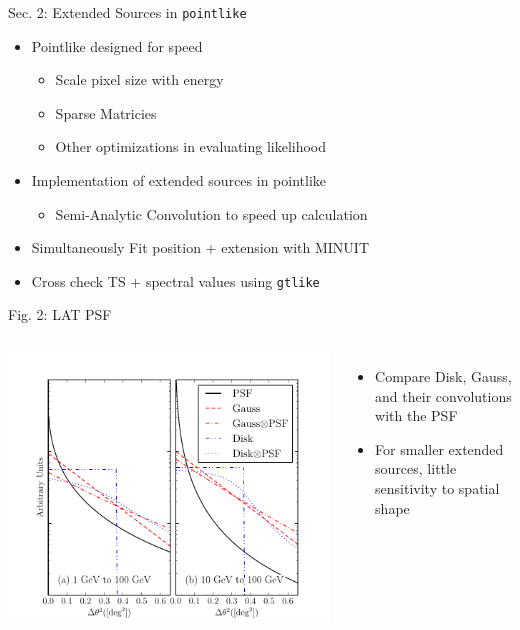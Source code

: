 \documentclass[12pt]{beamer}
\begin{document}
\begin{frame}{Sec. 2: Extended Sources in \texttt{pointlike}}
  \begin{itemize}
    \item Pointlike designed for speed
    \begin{itemize}
    \item Scale pixel size with energy
    \item Sparse Matricies
    \item Other optimizations in evaluating likelihood
    \end{itemize}
    \item Implementation of extended sources in pointlike
    \begin{itemize}
      \item Semi-Analytic Convolution to speed up calculation
    \end{itemize}
    \item Simultaneously Fit position + extension with MINUIT
    \item Cross check TS + spectral values using \texttt{gtlike}
  \end{itemize}
\end{frame}


\begin{frame}{Fig. 2: LAT PSF}
  \begin{columns}
    \includegraphics[scale=0.50]{plots/compare_disk_gauss_color.pdf}
    \begin{itemize}
      \item Compare Disk, Gauss, and their convolutions with 
      the PSF
      \item For smaller extended sources, little sensitivity
      to spatial shape
    \end{itemize}
  \end{columns}
\end{frame}
\end{document}
